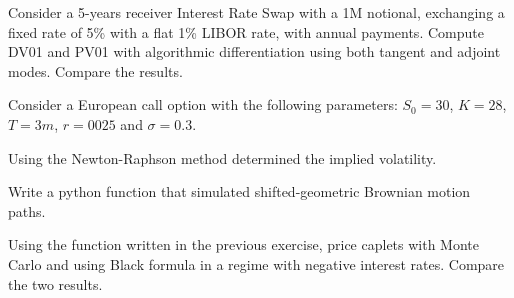 \documentclass[12pt,a4paper]{book}
\begin{document}
\begin{exercise}[subtitle=AD for a Swap (\texttt{python})]
Consider a 5-years receiver Interest Rate Swap with a 1M notional, exchanging a fixed rate of 5\% with a flat 1\% LIBOR rate, with annual payments. 
Compute DV01 and PV01 with algorithmic differentiation using both tangent and adjoint modes. Compare the results.
\end{exercise}

\begin{exercise}[subtitle=BS Implied Volatility (\texttt{python})]
Consider a European call option with the following parameters: $S_0=30$, $K=28$, $T=3m$, $r=0025$ and $\sigma=0.3$.

Using the Newton-Raphson method determined the implied volatility.
\end{exercise}

\begin{exercise}[subtitle=Shifted Brownian Motion (\texttt{python})]
Write a python function that simulated shifted-geometric Brownian motion paths.
\end{exercise}

\begin{exercise}[subtitle=Negative Rates (\texttt{python})]
Using the function written in the previous exercise, price caplets with Monte Carlo and using Black formula in a regime with negative interest rates. Compare the two results.
\end{exercise}
\end{document}
